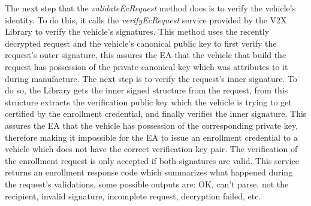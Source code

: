 The next step that the \textit{validateEcRequest} method does is to verify the vehicle's identity. To do this, it calls the \textit{verifyEcRequest} service provided by the V2X Library to verify the vehicle's signatures. This method uses the recently decrypted request and the vehicle's canonical public key to first verify the request's outer signature, this assures the EA that the vehicle that build the request has possession of the private canonical key which was attributes to it during manufacture. The next step is to verify the request's inner signature. To do so, the Library gets the inner signed structure from the request, from this structure extracts the verification public key which the vehicle is trying to get certified by the enrollment credential, and finally verifies the inner signature. This assures the EA that the vehicle has possession of the corresponding private key, therefore making it impossible for the EA to issue an enrollment credential to a vehicle which does not have the correct verification key pair. The verification of the enrollment request is only accepted if both signatures are valid. This service returns an enrollment response code which summarizes what happened during the request's validations, some possible outputs are: OK, can't parse, not the recipient, invalid signature, incomplete request, decryption failed, etc. 

